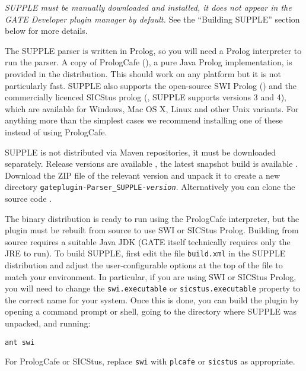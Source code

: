 \emph{SUPPLE must be manually downloaded and installed, it does not appear
in the GATE Developer plugin manager by default.}  See the ``Building SUPPLE''
section below for more details.


The SUPPLE parser is written in Prolog, so you will need a Prolog interpreter
to run the parser.  A copy of PrologCafe
(), a pure Java
Prolog implementation, is provided in the distribution.  This should work on
any platform but it is not particularly fast.  SUPPLE also supports the
open-source SWI Prolog () and the
commercially licenced SICStus prolog
(, SUPPLE supports versions 3 and 4),
which are available for Windows, Mac OS X, Linux and other Unix variants.  For
anything more than the simplest cases we recommend installing one of these
instead of using PrologCafe.


SUPPLE is not distributed via Maven repositories, it must be downloaded
separately.  Release versions are available
,
the latest snapshot build is available
.
Download the ZIP file of the relevant version and unpack it to create a new directory
\texttt{gateplugin-Parser\_SUPPLE-\emph{version}}.
Alternatively you can clone the source code
.

The binary distribution is ready to run using the PrologCafe interpreter, but
the plugin must be rebuilt from source to use SWI or SICStus Prolog.  Building
from source requires a suitable Java JDK (GATE itself technically requires only
the JRE to run). To build SUPPLE, first edit the file {\tt build.xml} in the
SUPPLE distribution and adjust the user-configurable options at the top of the
file to match your environment.  In particular, if you are using SWI or SICStus Prolog,
you will need to change the {\tt swi.executable} or {\tt sicstus.executable}
property to the correct name for your system. Once this is done, you can build
the plugin by opening a command prompt or shell, going to the directory where
SUPPLE was unpacked, and running:
\begin{small}\begin{verbatim}
ant swi
\end{verbatim}\end{small}
For PrologCafe or SICStus, replace {\tt swi} with {\tt plcafe} or {\tt sicstus} as
appropriate.

